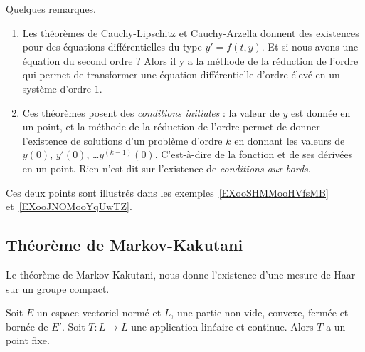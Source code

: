 \begin{remark}
	Quelques remarques.
	\begin{enumerate}
		\item
		      Les théorèmes de Cauchy-Lipschitz et Cauchy-Arzella donnent des existences pour des équations différentielles du type \( y'=f(t,y)\). Et si nous avons une équation du second ordre ? Alors il y a la méthode de la réduction de l'ordre qui permet de transformer une équation différentielle d'ordre élevé en un système d'ordre \( 1\).
		\item
		      Ces théorèmes posent des \emph{conditions initiales} : la valeur de \( y\) est donnée en un point, et la méthode de la réduction de l'ordre permet de donner l'existence de solutions d'un problème d'ordre \( k\) en donnant les valeurs de \( y(0)\), \( y'(0)\), \ldots \( y^{(k-1)}(0)\). C'est-à-dire de la fonction et de ses dérivées en un point. Rien n'est dit sur l'existence de \emph{conditions aux bords}.
	\end{enumerate}
	Ces deux points sont illustrés dans les exemples~\ref{EXooSHMMooHVfsMB} et~\ref{EXooJNOMooYqUwTZ}.
\end{remark}

\subsection{Théorème de Markov-Kakutani}

Le théorème de Markov-Kakutani, nous donne l'existence d'une mesure de Haar sur un groupe compact.

\begin{theorem}   \label{ThoeJCdMP}
	Soit \( E\) un espace vectoriel normé et \( L\), une partie non vide, convexe, fermée et bornée de \( E'\). Soit \( T\colon L\to L\) une application linéaire et continue. Alors \( T\) a un point fixe.
\end{theorem}

